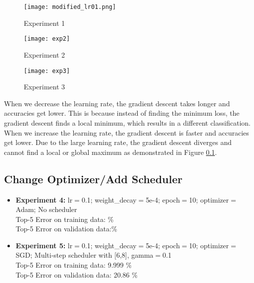 \documentclass{article}
\begin{document}
\begin{figure}[ht!]
    \centering
    \texttt{[image: modified\_lr01.png]}
    \caption{Experiment 1}
    \label{exp1}
\end{figure}

\begin{figure}[ht!]
    \centering
    \texttt{[image: exp2]}
    \caption{Experiment 2}
    \label{exp2}
\end{figure}

\begin{figure}[ht!]
    \centering
    \texttt{[image: exp3]}
    \caption{Experiment 3}
    \label{exp3}
\end{figure}


When we decrease the learning rate, the gradient descent takes longer and accuracies get lower. This is because instead of finding the minimum loss, the gradient descent finds a local minimum, which results in a different classification. \\
When we increase the learning rate, the gradient descent is faster and accuracies get lower. Due to the large learning rate, the gradient descent diverges and cannot find a local or global maximum as demonstrated in Figure \ref{}.





\subsection{Change Optimizer/Add Scheduler}

\begin{itemize}
     \item \textbf{Experiment 4:} lr$=$0.1; weight\_decay$=$5e-4; epoch$=$10; optimizer$=$Adam; No scheduler \\ 
    Top-5 Error on training data: \% \\
    Top-5 Error on validation data:\% \\
    
    \item \textbf{Experiment 5:} lr$=$0.1; weight\_decay$=$5e-4;  epoch$=$10; optimizer$=$SGD; Multi-step scheduler with [6,8], gamma$=$0.1 \\
    Top-5 Error on training data: 9.999 \% \\
    Top-5 Error on validation data: 20.86 \% \\
\end{itemize}
\end{document}
